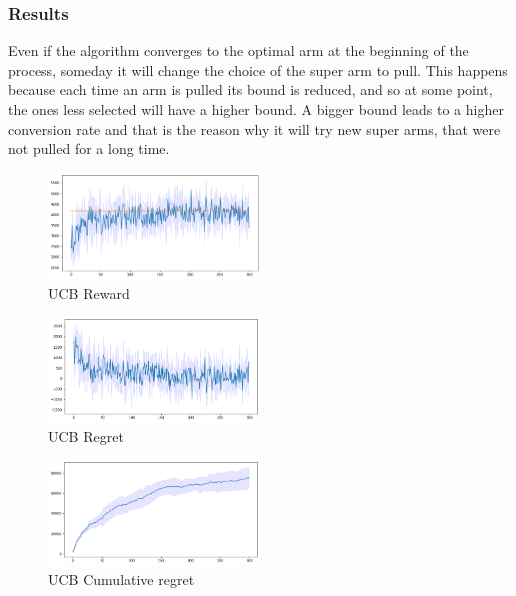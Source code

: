 \subsubsection{Results}
Even if the algorithm converges to the optimal arm at the beginning of the process, someday it will change the choice of the super arm to pull. This happens because each time an arm is pulled its bound is reduced, and so at some point, the ones less selected will have a higher bound. A bigger bound leads to a higher conversion rate and that is the reason why it will try new super arms, that were not pulled for a long time.
\begin{figure}[ht]
    \begin{center}
    \includegraphics[width=0.5\textwidth]{img/ucb3.png}
    \caption{UCB Reward}
    \label{fig:reward31}
    \end{center}
\end{figure}
\begin{multicols}{2}
    \begin{figure}[H]
        \begin{center}
        \includegraphics[width=0.5\textwidth]{img/ucb3_regret.png}
        \caption{UCB Regret}
        \label{fig:regret31}
        \end{center}
    \end{figure}
    \columnbreak
    \begin{figure}[H]
        \begin{center}
        \includegraphics[width=0.5\textwidth]{img/ucb3_cum_reg.png}
        \caption{UCB Cumulative regret}
        \label{fig:cum_reg31}
        \end{center}
    \end{figure}
\end{multicols}


